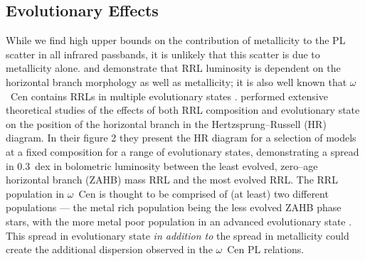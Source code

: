 \documentclass[a4paper,fleqn,usenatbib]{mnras}
\newcommand{\ocen}{$\omega$~Cen\xspace}
\begin{document}
\subsection{Evolutionary Effects}
\label{sec:evolution}
While we find high upper bounds on the contribution of metallicity to the PL scatter in all infrared passbands, it is unlikely that this scatter is due to metallicity alone. \citet{1986A&A...169..111G} and \citet{1991ApJ...373L..43L}  demonstrate that RRL luminosity is dependent on the horizontal branch morphology as well as metallicity; it is also well known that \ocen contains RRLs in multiple evolutionary states \citep{2008MmSAI..79..342S, 2015A&A...577A..99N}. \citet{2015ApJ...808...50M} performed extensive theoretical studies of the effects of both RRL composition and evolutionary state on the position of the horizontal branch in the Hertzsprung--Russell (HR) diagram. In their figure 2 they present the HR diagram for a selection of models at a fixed composition for a range of evolutionary states, demonstrating a spread in 0.3~dex in bolometric luminosity between the least evolved, zero--age horizontal branch (ZAHB) mass RRL and the most evolved RRL. The RRL population in \ocen is thought to be comprised of (at least) two different populations --- the metal rich population being the less evolved ZAHB phase stars, with the more metal poor population in an advanced evolutionary state \citep{2016MNRAS.457.4525T}. This spread in evolutionary state \textit{in addition to} the spread in metallicity could create the additional dispersion observed in the \ocen PL relations. 

\end{document}
